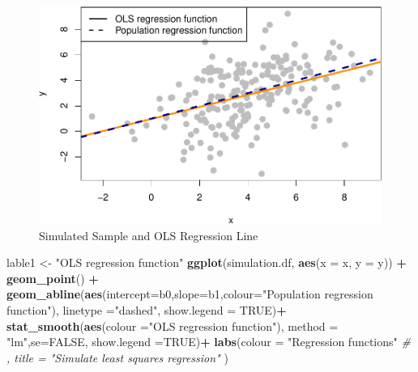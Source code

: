 \documentclass[]{book}
\newenvironment{Shaded}{\begin{snugshade}}{\end{snugshade}}
\newcommand{\CommentTok}[1]{\textcolor[rgb]{0.56,0.35,0.01}{\textit{#1}}}
\newcommand{\DataTypeTok}[1]{\textcolor[rgb]{0.13,0.29,0.53}{#1}}
\newcommand{\KeywordTok}[1]{\textcolor[rgb]{0.13,0.29,0.53}{\textbf{#1}}}
\newcommand{\NormalTok}[1]{#1}
\newcommand{\OperatorTok}[1]{\textcolor[rgb]{0.81,0.36,0.00}{\textbf{#1}}}
\newcommand{\OtherTok}[1]{\textcolor[rgb]{0.56,0.35,0.01}{#1}}
\newcommand{\StringTok}[1]{\textcolor[rgb]{0.31,0.60,0.02}{#1}}
\begin{document}
\begin{figure}

{\centering \includegraphics[width=0.8\linewidth]{MEM5220_R_files/figure-latex/fig5-1} 

}

\caption{Simulated Sample and OLS Regression Line}\label{fig:fig5}
\end{figure}

\begin{Shaded}
\begin{Highlighting}[]
\NormalTok{lable1 <-}\StringTok{ "OLS regression function"}
\KeywordTok{ggplot}\NormalTok{(simulation.df, }\KeywordTok{aes}\NormalTok{(}\DataTypeTok{x =}\NormalTok{ x,  }\DataTypeTok{y =}\NormalTok{ y)) }\OperatorTok{+}
\StringTok{  }\KeywordTok{geom_point}\NormalTok{() }\OperatorTok{+}
\StringTok{  }\KeywordTok{geom_abline}\NormalTok{(}\KeywordTok{aes}\NormalTok{(}\DataTypeTok{intercept=}\NormalTok{b0,}\DataTypeTok{slope=}\NormalTok{b1,}\DataTypeTok{colour=}\StringTok{"Population regression function"}\NormalTok{), }\DataTypeTok{linetype =}\StringTok{"dashed"}\NormalTok{, }\DataTypeTok{show.legend  =} \OtherTok{TRUE}\NormalTok{)}\OperatorTok{+}
\StringTok{  }\KeywordTok{stat_smooth}\NormalTok{(}\KeywordTok{aes}\NormalTok{(}\DataTypeTok{colour =}\StringTok{"OLS regression function"}\NormalTok{), }\DataTypeTok{method =} \StringTok{"lm"}\NormalTok{,}\DataTypeTok{se=}\OtherTok{FALSE}\NormalTok{, }\DataTypeTok{show.legend =}\OtherTok{TRUE}\NormalTok{)}\OperatorTok{+}
\StringTok{  }\KeywordTok{labs}\NormalTok{(}\DataTypeTok{colour =} \StringTok{"Regression functions"} 
       \CommentTok{# , title = "Simulate least squares regression"}
\NormalTok{  )}
\end{Highlighting}
\end{Shaded}
\end{document}
